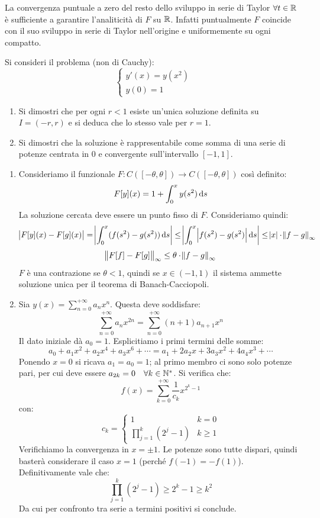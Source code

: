 \documentclass[a4paper]{article}\par \usepackage{style}\par
\begin{document}
La convergenza puntuale a zero del resto dello sviluppo in serie di Taylor $ \forall t \in \mathbb{R} $ è sufficiente a garantire l'analiticità di $ F $ su $ \mathbb{R} $. Infatti puntualmente $ F $ coincide con il suo sviluppo in serie di Taylor nell'origine e uniformemente su ogni compatto.\par \begin{vares}
  Si consideri il problema (non di Cauchy):
  \[
    \begin{cases}
      y'(x) = y(x^2) \\
      y(0) = 1
    \end{cases}
  \]
  \begin{enumerate}[label = (\roman*)]
  \item Si dimostri che per ogni $ r < 1 $ esiste un'unica soluzione definita su $ I = (-r, r) $ e si deduca che lo stesso vale per $ r = 1 $.
  \item Si dimostri che la soluzione è rappresentabile come somma di una serie di potenze centrata in 0 e convergente sull'intervallo $ [-1, 1] $.
  \end{enumerate}
\end{vares}\par \begin{enumerate}[label = (\roman*)]
\item Consideriamo il funzionale $ F \colon C \left( [-\theta, \theta] \right) \rightarrow C \left( [-\theta, \theta] \right) $ così definito:
  \[ F[y](x) = 1 + \int_{0}^{x} y(s^2) \dif s \]
  La soluzione cercata deve essere un punto fisso di $ F $. Consideriamo quindi:
  \[ \abs{ F[y](x) - F[g](x) } = \abs{ \int_{0}^{x} ( f(s^2) - g(s^2) ) \dif s } \leq \abs{ \int_{0}^{x} \abs{ f(s^2) - g(s^2) } \dif s } \leq \abs{x} \cdot \norm{f-g}_{\infty} \]
  \[ \norm{F[f] - F[g]}_{\infty} \leq \theta \cdot \norm{f-g}_{\infty} \]
  $ F $ è una contrazione se $ \theta < 1 $, quindi se $ x \in (-1,1) $ il sistema ammette soluzione unica per il teorema di Banach-Cacciopoli.
\item Sia $ y(x) = \sum_{n=0}^{+\infty} a_n x^n $. Questa deve soddisfare:
  \[ \sum_{n=0}^{+\infty} a_n x^{2n} = \sum_{n=0}^{+\infty} (n+1) a_{n+1} x^n \]
  Il dato iniziale dà $ a_0 = 1 $. Esplicitiamo i primi termini delle somme:
  \[ a_0 + a_1 x^2 + a_2 x^4 + a_3 x^6 + \cdots = a_1 + 2a_2 x + 3a_3 x^2 + 4a_4 x^3 + \cdots \]
  Ponendo $ x = 0 $ si ricava $ a_1 = a_0 = 1 $; al primo membro ci sono solo potenze pari, per cui deve essere $ a_{2k} = 0 \quad \forall k \in \mathbb{N}^*$. Si verifica che:
  \[ f(x) = \sum_{k=0}^{+\infty} \frac{1}{c_{k}} x^{2^k-1} \]
  con:
  \[ c_k = \begin{cases}
      1 & k=0\\
      \prod_{j=1}^{k} (2^j - 1) & k \ge 1
    \end{cases} \]
  Verifichiamo la convergenza in $ x = \pm 1 $. Le potenze sono tutte dispari, quindi basterà considerare il caso $ x = 1 $ (perché $ f(-1) = -f(1) $). Definitivamente vale che:
  \[ \prod_{j=1}^k (2^j - 1) \ge 2^k-1 \ge k^2 \]
  Da cui per confronto tra serie a termini positivi si conclude.\par \end{enumerate}\par 
\end{document}
